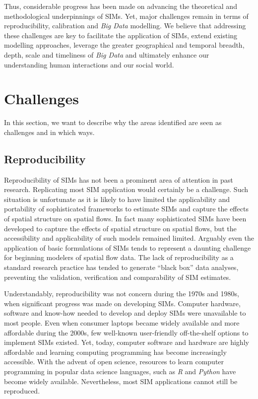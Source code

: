 \documentclass[11pt,letterpaper]{article}
\begin{document}
Thus, considerable progress has been made on advancing the theoretical and methodological underpinnings of SIMs.
Yet, major challenges remain in terms of reproducibility, calibration and \emph{Big Data} modelling.
We believe that addressing these challenges are key to facilitate the application of SIMs, extend existing modelling approaches, leverage the greater geographical and temporal breadth, depth, scale and timeliness of \emph{Big Data} and ultimately enhance our understanding human interactions and our social world.

\hypertarget{challenges}{%
\section{Challenges}\label{challenges}}

In this section, we want to describe why the areas identified are seen as challenges and in which ways.

\hypertarget{reproducibility}{%
\subsection{Reproducibility}\label{reproducibility}}

Reproducibility of SIMs has not been a prominent area of attention in past research.
Replicating most SIM application would certainly be a challenge.
Such situation is unfortunate as it is likely to have limited the applicability and portability of sophisticated frameworks to estimate SIMs and capture the effects of spatial structure on spatial flows.
In fact many sophisticated SIMs have been developed to capture the effects of spatial structure on spatial flows, but the accessibility and applicability of such models remained limited.
Arguably even the application of basic formulations of SIMs tends to represent a daunting challenge for beginning modelers of spatial flow data.
The lack of reproducibility as a standard research practice has tended to generate ``black box'' data analyses, preventing the validation, verification and comparability of SIM estimates.

Understandably, reproducibility was not concern during the 1970s and 1980s, when significant progress was made on developing SIMs.
Computer hardware, software and know-how needed to develop and deploy SIMs were unavailable to most people.
Even when consumer laptops became widely available and more affordable during the 2000s, few well-known user-friendly off-the-shelf options to implement SIMs existed.
Yet, today, computer software and hardware are highly affordable and learning computing programming has become increasingly accessible.
With the advent of open science, resources to learn computer programming in popular data science languages, such as \emph{R} and \emph{Python} have become widely available.
Nevertheless, most SIM applications cannot still be reproduced.
\end{document}
